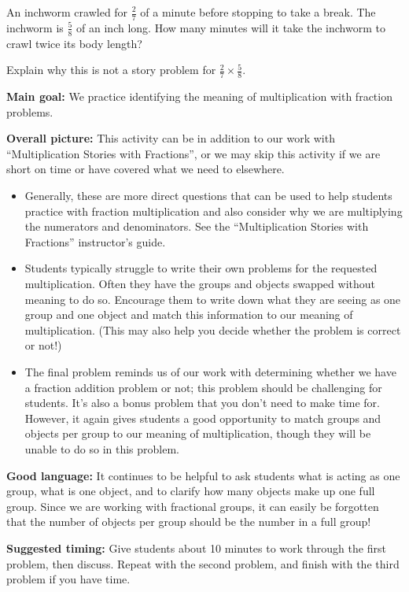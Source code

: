 \documentclass[nooutcomes,noauthor,handout]{ximera}
\begin{document}
\begin{problem}
An inchworm crawled for $\frac{2}{7}$ of a minute before stopping to take a break. The inchworm is $\frac{5}{8}$ of an inch long. How many minutes will it take the inchworm to crawl twice its body length?

Explain why this is not a story problem for $\frac{2}{7} \times \frac{5}{8}$. 
\end{problem}




\newpage

\begin{instructorNotes} 



{\bf Main goal:} We practice identifying the meaning of multiplication with fraction problems.


{\bf Overall picture:} This activity can be in addition to our work with ``Multiplication Stories with Fractions'', or we may skip this activity if we are short on time or have covered what we need to elsewhere.

\begin{itemize}
	\item Generally, these are more direct questions that can be used to help students practice with fraction multiplication and also consider why we are multiplying the numerators and denominators. See the ``Multiplication Stories with Fractions'' instructor's guide.
	\item Students typically struggle to write their own problems for the requested multiplication. Often they have the groups and objects swapped without meaning to do so. Encourage them to write down what they are seeing as one group and one object and match this information to our meaning of multiplication. (This may also help you decide whether the problem is correct or not!)
	\item The final problem reminds us of our work with determining whether we have a fraction addition problem or not; this problem should be challenging for students. It's also a bonus problem that you don't need to make time for. However, it again gives students a good opportunity to match groups and objects per group to our meaning of multiplication, though they will be unable to do so in this problem.
\end{itemize}


{\bf Good language:}  It continues to be helpful to ask students what is acting as one group, what is one object, and to clarify how many objects make up one full group. Since we are working with fractional groups, it can easily be forgotten that the number of objects per group should be the number in a full group!


{\bf Suggested timing:} Give students about 10 minutes to work through the first problem, then discuss. Repeat with the second problem, and finish with the third problem if you have time.




\end{instructorNotes}
\end{document}
